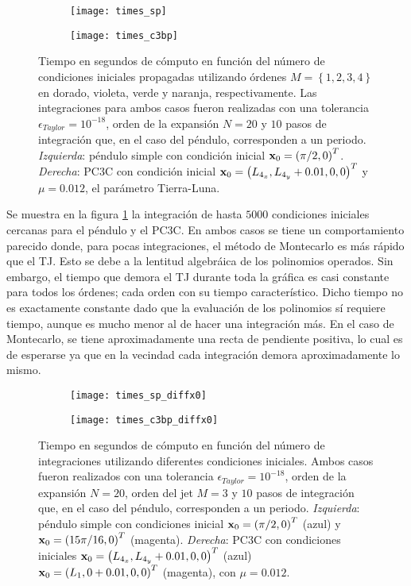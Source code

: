 \begin{figure}[h!]
\centering
\begin{subfigure}{0.49\textwidth}
	\centering
	\texttt{[image: times\_sp]}
\end{subfigure}
%
\begin{subfigure}{0.49\textwidth}
	\centering
	\texttt{[image: times\_c3bp]}
\end{subfigure}
\caption{Tiempo en segundos de cómputo en función del número de condiciones iniciales propagadas utilizando órdenes $M = \left\lbrace 1,2,3,4 \right\rbrace$ en dorado, violeta, verde y naranja, respectivamente. Las integraciones para ambos casos fueron realizadas con una tolerancia $\epsilon_{Taylor} = 10^{-18}$, orden de la expansión $N=20$ y $10$ pasos de integración que, en el caso del péndulo, corresponden a un periodo. \textit{Izquierda}: péndulo simple con condición inicial $\mathbf{x}_0 = \left(\pi/2, 0 \right)^T$. \textit{Derecha}: PC3C con condición inicial $\mathbf{x}_0 = \left(L_{4_x}, L_{4_y} + 0.01, 0, 0 \right)^T$ y $\mu = 0.012$, el parámetro Tierra-Luna.}
\label{fig:times}
\end{figure}

Se muestra en la figura \ref{fig:times} la integración de hasta $5000$ condiciones iniciales cercanas para el péndulo y el PC3C. En ambos casos se tiene un comportamiento parecido donde, para pocas integraciones, el método de Montecarlo es más rápido que el TJ. Esto se debe a la lentitud algebráica de los polinomios operados. Sin embargo, el tiempo que demora el TJ durante toda la gráfica es casi constante para todos los órdenes; cada orden con su tiempo característico. Dicho tiempo no es exactamente constante dado que la evaluación de los polinomios sí requiere tiempo, aunque es mucho menor al de hacer una integración más. En el caso de Montecarlo, se tiene aproximadamente una recta de pendiente positiva, lo cual es de esperarse ya que en la vecindad cada integración demora aproximadamente lo mismo. 

\begin{figure}[h!]
\centering
\begin{subfigure}{0.49\textwidth}
	\centering
	\texttt{[image: times\_sp\_diffx0]}
\end{subfigure}
%
\begin{subfigure}{0.49\textwidth}
	\centering
	\texttt{[image: times\_c3bp\_diffx0]}
\end{subfigure}
\caption{Tiempo en segundos de cómputo en función del número de integraciones utilizando diferentes condiciones iniciales. Ambos casos fueron realizados con una tolerancia $\epsilon_{Taylor} = 10^{-18}$, orden de la expansión $N=20$, orden del jet $M=3$ y $10$ pasos de integración que, en el caso del péndulo, corresponden a un periodo. \textit{Izquierda}: péndulo simple con condiciones inicial $\mathbf{x}_0 = \left(\pi/2, 0 \right)^T$ (azul) y $\mathbf{x}_0 = \left(15\pi/16, 0 \right)^T$ (magenta). \textit{Derecha}: PC3C con condiciones iniciales $\mathbf{x}_0 = \left(L_{4_x}, L_{4_y} + 0.01, 0, 0 \right)^T$ (azul) $\mathbf{x}_0 = \left(L_{1}, 0 + 0.01, 0, 0 \right)^T$ (magenta), con $\mu = 0.012$.}
\label{fig:times_diffx0}
\end{figure}

